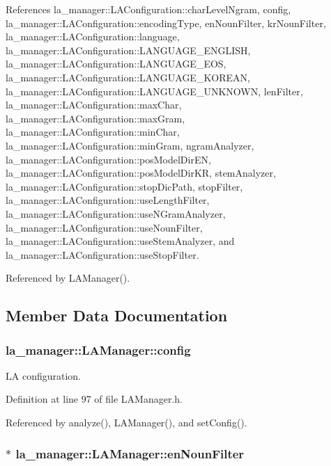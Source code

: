 References la\_\-manager::LAConfiguration::charLevelNgram, config, la\_\-manager::LAConfiguration::encodingType, enNounFilter, krNounFilter, la\_\-manager::LAConfiguration::language, la\_\-manager::LAConfiguration::LANGUAGE\_\-ENGLISH, la\_\-manager::LAConfiguration::LANGUAGE\_\-EOS, la\_\-manager::LAConfiguration::LANGUAGE\_\-KOREAN, la\_\-manager::LAConfiguration::LANGUAGE\_\-UNKNOWN, lenFilter, la\_\-manager::LAConfiguration::maxChar, la\_\-manager::LAConfiguration::maxGram, la\_\-manager::LAConfiguration::minChar, la\_\-manager::LAConfiguration::minGram, ngramAnalyzer, la\_\-manager::LAConfiguration::posModelDirEN, la\_\-manager::LAConfiguration::posModelDirKR, stemAnalyzer, la\_\-manager::LAConfiguration::stopDicPath, stopFilter, la\_\-manager::LAConfiguration::useLengthFilter, la\_\-manager::LAConfiguration::useNGramAnalyzer, la\_\-manager::LAConfiguration::useNounFilter, la\_\-manager::LAConfiguration::useStemAnalyzer, and la\_\-manager::LAConfiguration::useStopFilter.

Referenced by LAManager().

\subsection{Member Data Documentation}
\hypertarget{classla__manager_1_1LAManager_00460d91a83a5f42c47b989d80a5b86f}{
\subsubsection[{config}]{ {\bf la\_\-manager::LAManager::config}}}
\label{classla__manager_1_1LAManager_00460d91a83a5f42c47b989d80a5b86f}


LA configuration. 



Definition at line 97 of file LAManager.h.

Referenced by analyze(), LAManager(), and setConfig().\hypertarget{classla__manager_1_1LAManager_78caa4de3178a8bcf37e33272e337f46}{
\subsubsection[{enNounFilter}]{$\ast$ {\bf la\_\-manager::LAManager::enNounFilter}}}
\label{classla__manager_1_1LAManager_78caa4de3178a8bcf37e33272e337f46}




